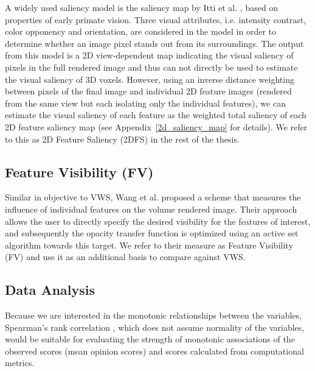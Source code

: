 A widely used saliency model is the saliency map by Itti et al. \cite{itti_model_1998}, based on properties of early primate vision. Three visual attributes, i.e. intensity contrast, color opponency and orientation, are considered in the model in order to determine whether an image pixel stands out from its surroundings. The output from this model is a 2D view-dependent map indicating the visual saliency of pixels in the full rendered image and thus can not directly be used to estimate the visual saliency of 3D voxels. However, using an inverse distance weighting \cite{shepard_two-dimensional_1968} between pixels of the final image and individual 2D feature images (rendered from the same view but each isolating only the individual features), we can estimate the visual saliency of each feature as the weighted total saliency of each 2D feature saliency map (see Appendix~\ref{2d_saliency_map} for details). We refer to this as 2D Feature Saliency (2DFS) in the rest of the thesis.

\subsection{Feature Visibility (FV)}
Similar in objective to VWS, Wang et al. \cite{wang_efficient_2011} proposed a scheme that measures the influence of individual features on the volume rendered image. Their approach allows the user to directly specify the desired visibility for the features of interest, and subsequently the opacity transfer function is optimized using an active set algorithm towards this target. We refer to their measure as Feature Visibility (FV) and use it as an additional basis to compare against VWS.

\subsection{Data Analysis}
Because we are interested in the monotonic relationships between the variables, Spearman's rank correlation \cite{cunningham_experimental_2011}, which does not assume normality of the variables, would be suitable for evaluating the strength of monotonic associations of the observed scores (mean opinion scores) and scores calculated from computational metrics. 

